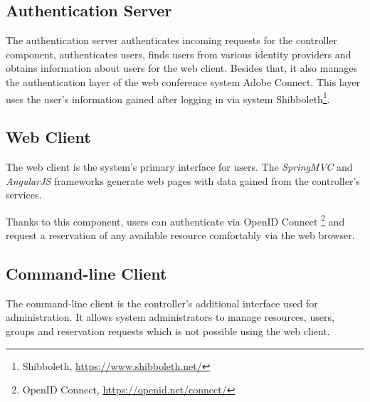 \subsection{Authentication Server}
The authentication server authenticates incoming requests for the controller component, authenticates users, finds users from various identity providers and obtains information about users for the web client.
Besides that, it also manages the authentication layer of the web conference system Adobe Connect. This layer uses the user's information gained after logging in via system Shibboleth\footnote{Shibboleth, \url{https://www.shibboleth.net/}}.

\subsection{Web Client} \label{webclient}
The web client is the system's primary interface for users. The \emph{SpringMVC} and \emph{AngularJS} frameworks generate web pages with data gained from the controller’s services.

Thanks to this component, users can authenticate via OpenID Connect \footnote{OpenID Connect, \url{https://openid.net/connect/}} and request a reservation of any available resource comfortably via the web browser.

\subsection{Command-line Client}
The command-line client is the controller's additional interface used for administration. It allows system administrators to manage resources, users, groups and reservation requests which is not possible using the web client.

